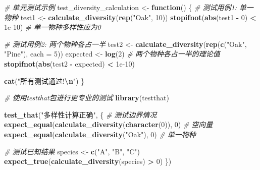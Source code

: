\documentclass[
  twoside]{book}
\newenvironment{Shaded}{\begin{snugshade}}{\end{snugshade}}
\newcommand{\AttributeTok}[1]{\textcolor[rgb]{0.13,0.29,0.53}{#1}}
\newcommand{\CommentTok}[1]{\textcolor[rgb]{0.56,0.35,0.01}{\textit{#1}}}
\newcommand{\ControlFlowTok}[1]{\textcolor[rgb]{0.13,0.29,0.53}{\textbf{#1}}}
\newcommand{\DecValTok}[1]{\textcolor[rgb]{0.00,0.00,0.81}{#1}}
\newcommand{\FloatTok}[1]{\textcolor[rgb]{0.00,0.00,0.81}{#1}}
\newcommand{\FunctionTok}[1]{\textcolor[rgb]{0.13,0.29,0.53}{\textbf{#1}}}
\newcommand{\NormalTok}[1]{#1}
\newcommand{\OtherTok}[1]{\textcolor[rgb]{0.56,0.35,0.01}{#1}}
\newcommand{\SpecialCharTok}[1]{\textcolor[rgb]{0.81,0.36,0.00}{\textbf{#1}}}
\newcommand{\StringTok}[1]{\textcolor[rgb]{0.31,0.60,0.02}{#1}}
\begin{document}
\begin{Shaded}
\begin{Highlighting}[]
\CommentTok{\# 单元测试示例}
\NormalTok{test\_diversity\_calculation }\OtherTok{\textless{}{-}} \ControlFlowTok{function}\NormalTok{() \{}
  \CommentTok{\# 测试用例1: 单一物种}
\NormalTok{  test1 }\OtherTok{\textless{}{-}} \FunctionTok{calculate\_diversity}\NormalTok{(}\FunctionTok{rep}\NormalTok{(}\StringTok{"Oak"}\NormalTok{, }\DecValTok{10}\NormalTok{))}
  \FunctionTok{stopifnot}\NormalTok{(}\FunctionTok{abs}\NormalTok{(test1 }\SpecialCharTok{{-}} \DecValTok{0}\NormalTok{) }\SpecialCharTok{\textless{}} \FloatTok{1e{-}10}\NormalTok{)  }\CommentTok{\# 单一物种多样性应为0}

  \CommentTok{\# 测试用例2: 两个物种各占一半}
\NormalTok{  test2 }\OtherTok{\textless{}{-}} \FunctionTok{calculate\_diversity}\NormalTok{(}\FunctionTok{rep}\NormalTok{(}\FunctionTok{c}\NormalTok{(}\StringTok{"Oak"}\NormalTok{, }\StringTok{"Pine"}\NormalTok{), }\AttributeTok{each =} \DecValTok{5}\NormalTok{))}
\NormalTok{  expected }\OtherTok{\textless{}{-}} \FunctionTok{log}\NormalTok{(}\DecValTok{2}\NormalTok{)  }\CommentTok{\# 两个物种各占一半的理论值}
  \FunctionTok{stopifnot}\NormalTok{(}\FunctionTok{abs}\NormalTok{(test2 }\SpecialCharTok{{-}}\NormalTok{ expected) }\SpecialCharTok{\textless{}} \FloatTok{1e{-}10}\NormalTok{)}

  \FunctionTok{cat}\NormalTok{(}\StringTok{"所有测试通过!}\SpecialCharTok{\textbackslash{}n}\StringTok{"}\NormalTok{)}
\NormalTok{\}}

\CommentTok{\# 使用testthat包进行更专业的测试}
\FunctionTok{library}\NormalTok{(testthat)}

\FunctionTok{test\_that}\NormalTok{(}\StringTok{"多样性计算正确"}\NormalTok{, \{}
  \CommentTok{\# 测试边界情况}
  \FunctionTok{expect\_equal}\NormalTok{(}\FunctionTok{calculate\_diversity}\NormalTok{(}\FunctionTok{character}\NormalTok{(}\DecValTok{0}\NormalTok{)), }\DecValTok{0}\NormalTok{)  }\CommentTok{\# 空向量}
  \FunctionTok{expect\_equal}\NormalTok{(}\FunctionTok{calculate\_diversity}\NormalTok{(}\StringTok{"Oak"}\NormalTok{), }\DecValTok{0}\NormalTok{)  }\CommentTok{\# 单一物种}

  \CommentTok{\# 测试已知结果}
\NormalTok{  species }\OtherTok{\textless{}{-}} \FunctionTok{c}\NormalTok{(}\StringTok{"A"}\NormalTok{, }\StringTok{"B"}\NormalTok{, }\StringTok{"C"}\NormalTok{)}
  \FunctionTok{expect\_true}\NormalTok{(}\FunctionTok{calculate\_diversity}\NormalTok{(species) }\SpecialCharTok{\textgreater{}} \DecValTok{0}\NormalTok{)}
\NormalTok{\})}


\end{Highlighting}
\end{Shaded}
\end{document}
